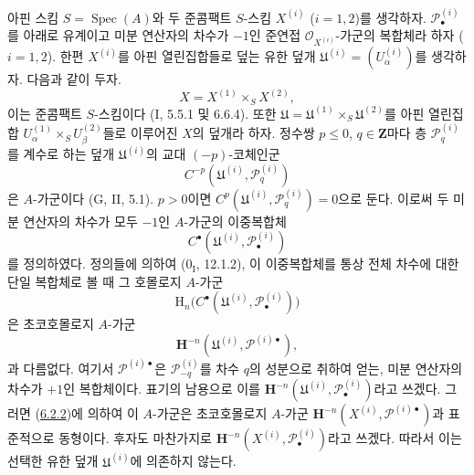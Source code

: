\begin{env}[6.6.1]
\label{III.6.6.1-fr}
아핀 스킴 $S=\operatorname{Spec}(A)$와 두 준콤팩트 $S$-스킴
$X^{(i)}$ ($i=1,2$)를 생각하자. $\mathscr P_\bullet^{(i)}$를 아래로
유계이고 미분 연산자의 차수가 $-1$인 준연접
$\mathscr O_{X^{(i)}}$-가군의 복합체라 하자 ($i=1,2$). 한편
$X^{(i)}$를 아핀 열린집합들로 덮는 유한 덮개
$\mathfrak U^{(i)}=(U_\alpha^{(i)})$를 생각하자. 다음과 같이 두자.
\[
  X=X^{(1)}\times_S X^{(2)},
\]
이는 준콤팩트 $S$-스킴이다 (I, 5.5.1 및 6.6.4). 또한
$\mathfrak U=\mathfrak U^{(1)}\times_S\mathfrak U^{(2)}$를 아핀
열린집합 $U_\alpha^{(1)}\times_S U_\beta^{(2)}$들로 이루어진 $X$의
덮개라 하자. 정수쌍 $p\leqslant0$, $q\in\mathbf Z$마다 층
$\mathscr P_q^{(i)}$를 계수로 하는 덮개 $\mathfrak U^{(i)}$의 교대
$(-p)$-코체인군
\[
  C^{-p}(\mathfrak U^{(i)},\mathscr P_q^{(i)})
\]
은 $A$-가군이다 (G, II, 5.1). $p>0$이면
$C^p(\mathfrak U^{(i)},\mathscr P_q^{(i)})=0$으로 둔다. 이로써 두
미분 연산자의 차수가 모두 $-1$인 $A$-가군의 이중복합체
\[
  C^\bullet(\mathfrak U^{(i)},\mathscr P_\bullet^{(i)})
\]
를 정의하였다. 정의들에 의하여 ($0_{\mathrm I}$, 12.1.2), 이
이중복합체를 통상 전체 차수에 대한 단일 복합체로 볼 때 그 호몰로지
$A$-가군
\[
  \mathrm H_n\bigl(C^\bullet
  (\mathfrak U^{(i)},\mathscr P_\bullet^{(i)})\bigr)
\]
은 초코호몰로지 $A$-가군
\[
  \mathbf H^{-n}
  (\mathfrak U^{(i)},\mathscr P^{(i)\bullet}),
\]
과 다름없다. 여기서 $\mathscr P^{(i)\bullet}$은
$\mathscr P_{-q}^{(i)}$를 차수 $q$의 성분으로 취하여 얻는, 미분
연산자의 차수가 $+1$인 복합체이다. 표기의 남용으로 이를
$\mathbf H^{-n}(\mathfrak U^{(i)},\mathscr P_\bullet^{(i)})$라고
쓰겠다. 그러면 (\hyperref[III.6.2.2-fr]{6.2.2})에 의하여 이
$A$-가군은 초코호몰로지 $A$-가군
$\mathbf H^{-n}(X^{(i)},\mathscr P^{(i)\bullet})$과 표준적으로
동형이다. 후자도 마찬가지로
$\mathbf H^{-n}(X^{(i)},\mathscr P_\bullet^{(i)})$라고 쓰겠다. 따라서
이는 선택한 유한 덮개 $\mathfrak U^{(i)}$에 의존하지 않는다.
\end{env}

